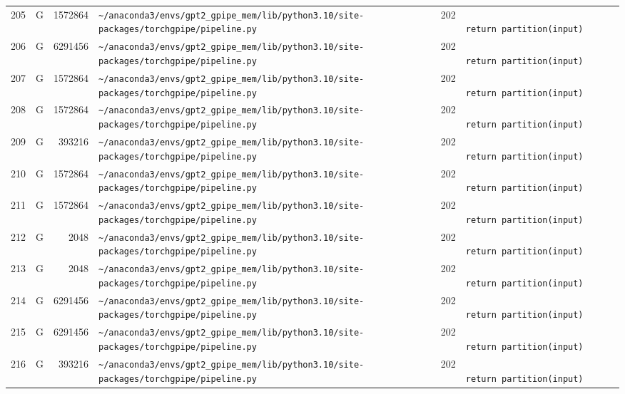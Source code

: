 \documentclass{article}
\begin{document}
\begin{longtable}{r l r p{6.5cm} r p{7.0cm}}
205 & G & 1572864 & \lstinline|~/anaconda3/envs/gpt2_gpipe_mem/lib/python3.10/site-packages/torchgpipe/pipeline.py| & 202 & \lstinline|                        return partition(input)| \\
206 & G & 6291456 & \lstinline|~/anaconda3/envs/gpt2_gpipe_mem/lib/python3.10/site-packages/torchgpipe/pipeline.py| & 202 & \lstinline|                        return partition(input)| \\
207 & G & 1572864 & \lstinline|~/anaconda3/envs/gpt2_gpipe_mem/lib/python3.10/site-packages/torchgpipe/pipeline.py| & 202 & \lstinline|                        return partition(input)| \\
208 & G & 1572864 & \lstinline|~/anaconda3/envs/gpt2_gpipe_mem/lib/python3.10/site-packages/torchgpipe/pipeline.py| & 202 & \lstinline|                        return partition(input)| \\
209 & G & 393216 & \lstinline|~/anaconda3/envs/gpt2_gpipe_mem/lib/python3.10/site-packages/torchgpipe/pipeline.py| & 202 & \lstinline|                        return partition(input)| \\
210 & G & 1572864 & \lstinline|~/anaconda3/envs/gpt2_gpipe_mem/lib/python3.10/site-packages/torchgpipe/pipeline.py| & 202 & \lstinline|                        return partition(input)| \\
211 & G & 1572864 & \lstinline|~/anaconda3/envs/gpt2_gpipe_mem/lib/python3.10/site-packages/torchgpipe/pipeline.py| & 202 & \lstinline|                        return partition(input)| \\
212 & G & 2048 & \lstinline|~/anaconda3/envs/gpt2_gpipe_mem/lib/python3.10/site-packages/torchgpipe/pipeline.py| & 202 & \lstinline|                        return partition(input)| \\
213 & G & 2048 & \lstinline|~/anaconda3/envs/gpt2_gpipe_mem/lib/python3.10/site-packages/torchgpipe/pipeline.py| & 202 & \lstinline|                        return partition(input)| \\
214 & G & 6291456 & \lstinline|~/anaconda3/envs/gpt2_gpipe_mem/lib/python3.10/site-packages/torchgpipe/pipeline.py| & 202 & \lstinline|                        return partition(input)| \\
215 & G & 6291456 & \lstinline|~/anaconda3/envs/gpt2_gpipe_mem/lib/python3.10/site-packages/torchgpipe/pipeline.py| & 202 & \lstinline|                        return partition(input)| \\
216 & G & 393216 & \lstinline|~/anaconda3/envs/gpt2_gpipe_mem/lib/python3.10/site-packages/torchgpipe/pipeline.py| & 202 & \lstinline|                        return partition(input)| \\

\end{longtable}
\end{document}

